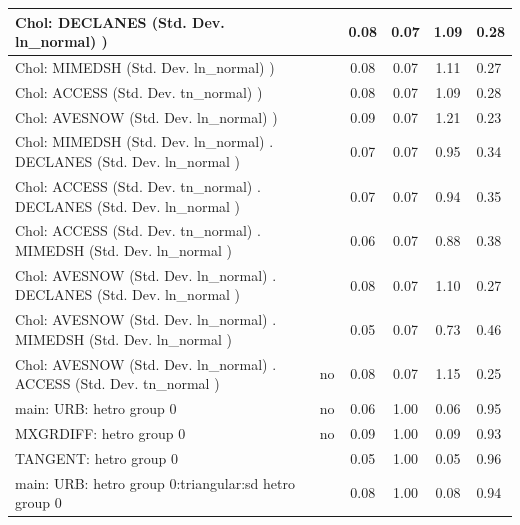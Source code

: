 \begin{table}
\begin{center}
\begin{tabular}{|l|l|c|c|c|l|}
			\hline
			 Chol: DECLANES (Std. Dev. ln_normal) ) &  & 0.08 & 0.07 & 1.09 & 0.28 \\
			\hline
			 Chol: MIMEDSH (Std. Dev. ln_normal) ) &  & 0.08 & 0.07 & 1.11 & 0.27 \\
			\hline
			 Chol: ACCESS (Std. Dev. tn_normal) ) &  & 0.08 & 0.07 & 1.09 & 0.28 \\
			\hline
			 Chol: AVESNOW (Std. Dev. ln_normal) ) &  & 0.09 & 0.07 & 1.21 & 0.23 \\
			\hline
			 Chol: MIMEDSH (Std. Dev. ln_normal) . DECLANES (Std. Dev.   ln_normal ) &  & 0.07 & 0.07 & 0.95 & 0.34 \\
			\hline
			 Chol: ACCESS (Std. Dev. tn_normal) . DECLANES (Std. Dev.   ln_normal ) &  & 0.07 & 0.07 & 0.94 & 0.35 \\
			\hline
			 Chol: ACCESS (Std. Dev. tn_normal) . MIMEDSH (Std. Dev.   ln_normal ) &  & 0.06 & 0.07 & 0.88 & 0.38 \\
			\hline
			 Chol: AVESNOW (Std. Dev. ln_normal) . DECLANES (Std. Dev.   ln_normal ) &  & 0.08 & 0.07 & 1.10 & 0.27 \\
			\hline
			 Chol: AVESNOW (Std. Dev. ln_normal) . MIMEDSH (Std. Dev.   ln_normal ) &  & 0.05 & 0.07 & 0.73 & 0.46 \\
			\hline
			 Chol: AVESNOW (Std. Dev. ln_normal) . ACCESS (Std. Dev.   tn_normal ) & no & 0.08 & 0.07 & 1.15 & 0.25 \\
			\hline
			main: URB: hetro group 0 & no & 0.06 & 1.00 & 0.06 & 0.95 \\
			\hline
			MXGRDIFF: hetro group 0 & no & 0.09 & 1.00 & 0.09 & 0.93 \\
			\hline
			TANGENT: hetro group 0 &  & 0.05 & 1.00 & 0.05 & 0.96 \\
			\hline
			main: URB: hetro group 0:triangular:sd  hetro group 0 &  & 0.08 & 1.00 & 0.08 & 0.94 \\
			\hline
		\end{tabular}
	\end{center}
\end{table}